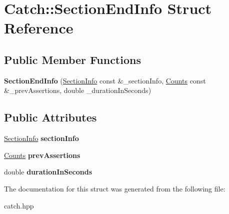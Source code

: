 \hypertarget{structCatch_1_1SectionEndInfo}{}\section{Catch\+:\+:Section\+End\+Info Struct Reference}
\label{structCatch_1_1SectionEndInfo}
\subsection*{Public Member Functions}
\begin{DoxyCompactItemize}
\item 
{\bfseries Section\+End\+Info} (\hyperlink{structCatch_1_1SectionInfo}{Section\+Info} const \&\+\_\+section\+Info, \hyperlink{structCatch_1_1Counts}{Counts} const \&\+\_\+prev\+Assertions, double \+\_\+duration\+In\+Seconds)\hypertarget{structCatch_1_1SectionEndInfo_abc9381c7c22b6907317ec985ccaa6713}{}\label{structCatch_1_1SectionEndInfo_abc9381c7c22b6907317ec985ccaa6713}

\end{DoxyCompactItemize}
\subsection*{Public Attributes}
\begin{DoxyCompactItemize}
\item 
\hyperlink{structCatch_1_1SectionInfo}{Section\+Info} {\bfseries section\+Info}\hypertarget{structCatch_1_1SectionEndInfo_a2d44793392cb83735d086d726822abe9}{}\label{structCatch_1_1SectionEndInfo_a2d44793392cb83735d086d726822abe9}

\item 
\hyperlink{structCatch_1_1Counts}{Counts} {\bfseries prev\+Assertions}\hypertarget{structCatch_1_1SectionEndInfo_ae70b154cbc05b5dd2901d97f89303d8c}{}\label{structCatch_1_1SectionEndInfo_ae70b154cbc05b5dd2901d97f89303d8c}

\item 
double {\bfseries duration\+In\+Seconds}\hypertarget{structCatch_1_1SectionEndInfo_a7c262f2dab9cff166b8eca620c47eea5}{}\label{structCatch_1_1SectionEndInfo_a7c262f2dab9cff166b8eca620c47eea5}

\end{DoxyCompactItemize}


The documentation for this struct was generated from the following file\+:\begin{DoxyCompactItemize}
\item 
catch.\+hpp\end{DoxyCompactItemize}

